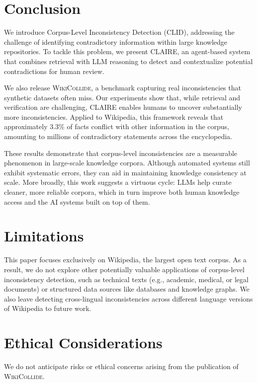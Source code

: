 \documentclass[11pt]{article}
\newcommand{\task}[0]{CLID\xspace}
\newcommand{\dataset}[0]{\textsc{WikiCollide}\xspace}
\newcommand{\system}[0]{\textsc{CLAIRE}\xspace}
\begin{document}


\section{Conclusion}
\label{sec:conclusion}

We introduce Corpus-Level Inconsistency Detection (\task), addressing the challenge of identifying contradictory information within large knowledge repositories. To tackle this problem, we present \system, an agent-based system that combines retrieval with LLM reasoning to detect and contextualize potential contradictions for human review.

We also release \dataset, a benchmark capturing real inconsistencies that synthetic datasets often miss. Our experiments show that, while retrieval and verification are challenging, \system enables humans to uncover substantially more inconsistencies. Applied to Wikipedia, this framework reveals that approximately 3.3\% of facts conflict with other information in the corpus, amounting to millions of contradictory statements across the encyclopedia.

These results demonstrate that corpus-level inconsistencies are a measurable phenomenon in large-scale knowledge corpora. Although automated systems still exhibit systematic errors, they can aid in maintaining knowledge consistency at scale. More broadly, this work suggests a virtuous cycle: LLMs help curate cleaner, more reliable corpora, which in turn improve both human knowledge access and the AI systems built on top of them.



\section*{Limitations}
This paper focuses exclusively on Wikipedia, the largest open text corpus. As a result, we do not explore other potentially valuable applications of corpus-level inconsistency detection, such as technical texts (e.g., academic, medical, or legal documents) or structured data sources like databases and knowledge graphs. We also leave detecting cross-lingual inconsistencies across different language versions of Wikipedia to future work.

\section*{Ethical Considerations}
We do not anticipate risks or ethical concerns arising from the publication of \dataset.
\end{document}
